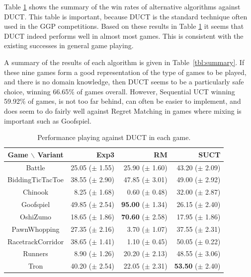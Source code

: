 \documentclass[conference]{IEEEtran}
\begin{document}
Table \ref{tbl:vsduct} shows the summary of the win rates of alternative algorithms against DUCT. This table is important, because DUCT is the 
standard technique often used in the GGP competitions. Based on these results in Table \ref{tbl:vsduct} it seems that DUCT indeed performs 
well in almost most games. This is consistent with the existing successes in general game playing. 

A summary of the results of each algorithm is given in Table~\ref{tbl:summary}. If these nine games form a good representation of the type 
of games to be played, and there is no domain knowledge, then DUCT seems to be a particularly safe choice, winning 66.65\% of games overall. 
However, Sequential UCT winning 59.92\% of games, is not too far behind, can often be easier to implement, and does seem to do fairly well
against Regret Matching in games where mixing is important such as Goofspiel.  


\begin{table}
\begin{center}
\begin{tabular}{|c|rrr|}
\hline
 Game $\backslash$ Variant    & Exp3		 & RM		 & SUCT		\\ 
\hline
                   Battle     & 25.05 ($\pm$ 1.55)	& 25.90 ($\pm$ 1.60)	      & 43.20 ($\pm$ 2.09)	\\ 
         BiddingTicTacToe     & 38.55 ($\pm$ 2.90)	& 47.85 ($\pm$ 3.01)	      & 49.00 ($\pm$ 2.92)	\\ 
                  Chinook     & 8.25 ($\pm$ 1.68)	  & 0.60 ($\pm$ 0.48)	        & 32.00 ($\pm$ 2.87)	\\ 
                Goofspiel     & 49.85 ($\pm$ 2.54)	& {\bf 95.00} ($\pm$ 1.34)	& 26.15 ($\pm$ 2.40)	\\ 
                 OshiZumo     & 18.65 ($\pm$ 1.86)	& {\bf 70.60} ($\pm$ 2.58)	& 17.95 ($\pm$ 1.86)	\\ 
             PawnWhopping     & 27.35 ($\pm$ 2.16)	& 3.70 ($\pm$ 1.07)	        & 37.55 ($\pm$ 2.31)	\\ 
        RacetrackCorridor     & 38.65 ($\pm$ 1.41)	& 1.10 ($\pm$ 0.45)       	& 50.05 ($\pm$ 0.22)	\\ 
                  Runners     & 8.90 ($\pm$ 1.26)	  & 20.20 ($\pm$ 2.13)	      & 48.55 ($\pm$ 3.06)	\\ 
                     Tron     & 40.20 ($\pm$ 2.54)	& 22.05 ($\pm$ 2.31)	      & {\bf 53.50} ($\pm$ 2.40)	\\ 
\hline
\end{tabular}
\end{center}
\caption{Performance playing against DUCT in each game. \label{tbl:vsduct}}
\end{table}
\end{document}
